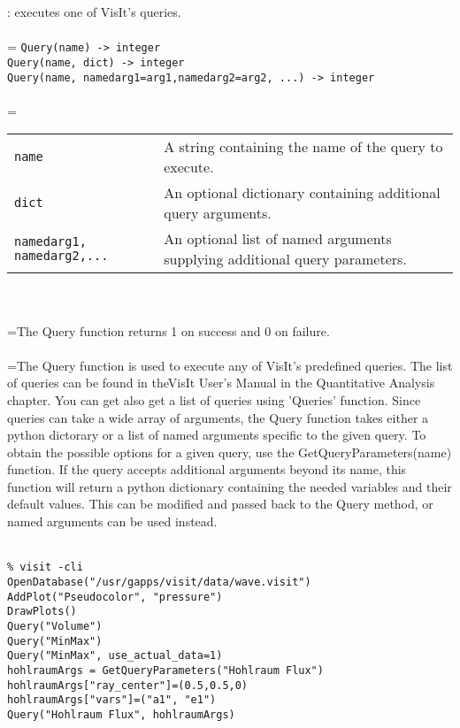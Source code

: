 \documentclass[10pt,a4paper]{report}
\begin{document}
{}
: executes one of VisIt's queries.\\[-3mm]

 \\ 
\hangindent=\parindent 
\verb!Query(name) -> integer!\\ 
\verb!Query(name, dict) -> integer!\\ 
\verb!Query(name, namedarg1=arg1,namedarg2=arg2, ...) -> integer!\\ [-3mm]

 \\ 
\hangindent=\parindent 
\begin{tabular}{lp{9cm}}
\verb!name! & A string containing the name of the query to execute. \\
\verb!dict! & An optional dictionary containing additional query arguments. \\
\verb!namedarg1, namedarg2,...! & An optional list of named arguments supplying additional query parameters. \\
\end{tabular} \\[-2mm]


 \\ 
\hangindent=\parindent The Query function returns 1 on success and 0 on failure. \\[-3mm] 

 \\ 
\hangindent=\parindent The Query function is used to execute any of VisIt's predefined queries. The list of queries can be found in theVisIt User's Manual in the Quantitative Analysis chapter. You can get also get a list of queries using 'Queries' function. Since queries can take a wide array of arguments, the Query function takes  either a python dictorary or a list of named arguments specific to the  given query.  To obtain the possible options for a given query, use the  GetQueryParameters(name) function.  If the query accepts additional  arguments beyond its name, this function will return a python dictionary containing the needed variables and their default values.  This can be modified and passed back to the Query method, or named arguments can be used instead. \\[-3mm] 

\\[-6mm]
\begin{verbatim}% visit -cli
OpenDatabase("/usr/gapps/visit/data/wave.visit")
AddPlot("Pseudocolor", "pressure")
DrawPlots()
Query("Volume")
Query("MinMax")
Query("MinMax", use_actual_data=1)
hohlraumArgs = GetQueryParameters("Hohlraum Flux")
hohlraumArgs["ray_center"]=(0.5,0.5,0)
hohlraumArgs["vars"]=("a1", "e1")
Query("Hohlraum Flux", hohlraumArgs)
\end{verbatim}
\newpage
\end{document}
